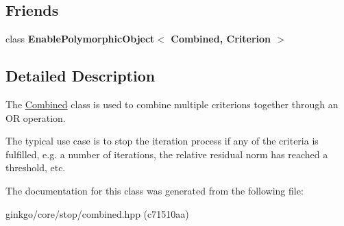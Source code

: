 \subsection*{Friends}
\begin{DoxyCompactItemize}
\item 
\mbox{\label{classgko_1_1stop_1_1Combined_a7c6977e97337814148e9c8ba5801ebf9}} 
class {\bfseries Enable\+Polymorphic\+Object$<$ Combined, Criterion $>$}
\end{DoxyCompactItemize}


\subsection{Detailed Description}
The \hyperlink{classgko_1_1stop_1_1Combined}{Combined} class is used to combine multiple criterions together through an OR operation. 

The typical use case is to stop the iteration process if any of the criteria is fulfilled, e.\+g. a number of iterations, the relative residual norm has reached a threshold, etc. 

The documentation for this class was generated from the following file\+:\begin{DoxyCompactItemize}
\item 
ginkgo/core/stop/combined.\+hpp (c71510aa)\end{DoxyCompactItemize}
